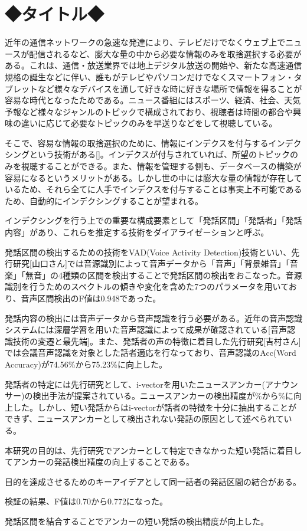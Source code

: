 \documentclass[11pt,a4paper]{jsarticle}
\begin{document}
%
%
\section*{◆タイトル◆}

\par
近年の通信ネットワークの急速な発達により、テレビだけでなくウェブ上でニュースが配信されるなど、膨大な量の中から必要な情報のみを取捨選択する必要がある。これは、通信・放送業界では地上デジタル放送の開始や、新たな高速通信規格の誕生などに伴い、誰もがテレビやパソコンだけでなくスマートフォン・タブレットなど様々なデバイスを通して好きな時に好きな場所で情報を得ることが容易な時代となったためである。ニュース番組にはスポーツ、経済、社会、天気予報など様々なジャンルのトピックで構成されており、視聴者は時間の都合や興味の違いに応じて必要なトピックのみを早送りなどをして視聴している。


\par
そこで、容易な情報の取捨選択のために、情報にインデクスを付与するインデクシングという技術がある[]。インデクスが付与されていれば、所望のトピックのみを視聴することができる。また、情報を管理する側も、データベースの構築が容易になるというメリットがある。しかし世の中には膨大な量の情報が存在しているため、それら全てに人手でインデクスを付与することは事実上不可能であるため、自動的にインデクシングすることが望まれる。

\par
インデクシングを行う上での重要な構成要素として「発話区間」「発話者」「発話内容」があり、これらを推定する技術をダイアライゼーションと呼ぶ。

\par
発話区間の検出するための技術をVAD(Voice Activity Detection)技術といい、先行研究[山口さん]では音源識別によって音声データから「音声」「背景雑音」「音楽」「無音」の4種類の区間を検出することで発話区間の検出をおこなった。音源識別を行うためのスペクトルの傾きや変化を含めた7つのパラメータを用いており、音声区間検出のF値は0.948であった。


\par
発話内容の検出には音声データから音声認識を行う必要がある。近年の音声認識システムには深層学習を用いた音声認識によって成果が確認されている[音声認識技術の変遷と最先端]。また、発話者の声の特徴に着目した先行研究[吉村さん]では会議音声認識を対象とした話者適応を行なっており、音声認識のAcc(Word Accuracy)が74.56\%から75.23\%に向上した。


\par
発話者の特定には先行研究として、i-vectorを用いたニュースアンカー(アナウンサー)の検出手法が提案されている。ニュースアンカーの検出精度が\%から\%に向上した。しかし、短い発話からはi-vectorが話者の特徴を十分に抽出することができず、ニュースアンカーとして検出されない発話の原因として述べられている。


\par
本研究の目的は、先行研究でアンカーとして特定できなかった短い発話に着目してアンカーの発話検出精度の向上することである。

\par
目的を達成させるためのキーアイデアとして同一話者の発話区間の結合がある。


\par
検証の結果、F値は0.70から0.772になった。


\par
発話区間を結合することでアンカーの短い発話の検出精度が向上した。

%
%
\end{document}
